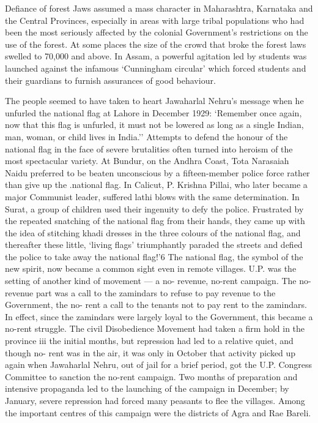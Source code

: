 Defiance of forest Jaws assumed a mass character in Maharashtra, Karnataka and the Central Provinces, especially in areas with large tribal populations who had been the most seriously affected by the colonial Government's restrictions on the use of the forest. At some places the size of the crowd that broke the forest laws swelled to 70,000 and above. In Assam, a powerful agitation led by students was launched against the infamous `Cunningham circular' which forced students and their guardians to furnish assurances of good behaviour. 

The people seemed to have taken to heart Jawaharlal Nehru's message when he unfurled the national flag at Lahore in December 1929: `Remember once again, now that this flag is unfurled, it must not be lowered as long as a single Indian, man, woman, or child lives in India.'' Attempts to defend the honour of the national flag in the face of severe brutalities often turned into heroism of the most spectacular variety. At Bundur, on the Andhra Coast, Tota Narasaiah Naidu preferred to be beaten unconscious by a fifteen-member police force rather than give up the .national flag. In Calicut, P. Krishna Pillai, who later became a major Communist leader, suffered lathi blows with the same determination. In Surat, a group of children used their ingenuity to defy the police. Frustrated by the repeated snatching of the national flag from their hands, they came up with the idea of stitching khadi dresses in the three colours of the national flag, and thereafter these little, `living flags' triumphantly paraded the streets and defied the police to take away the national flag!'6 The national flag, the symbol of the new spirit, now became a common sight even in remote villages. U.P. was the setting of another kind of movement — a no- revenue, no-rent campaign. The no-revenue part was a call to the zamindars to refuse to pay revenue to the Government, the no- rent a call to the tenants not to pay rent to the zamindars. In effect, since the zamindars were largely loyal to the Government, this became a no-rent struggle. The civil Disobedience Movement had taken a firm hold in the province iii the initial months, but repression had led to a relative quiet, and though no- rent was in the air, it was only in October that activity picked up again when Jawaharlal Nehru, out of jail for a brief period, got the U.P. Congress Committee to sanction the no-rent campaign. Two months of preparation and intensive propaganda led to the launching of the campaign in December; by January, severe repression had forced many peasants to flee the villages. Among the important centres of this campaign were the districts of Agra and Rae Bareli. 

